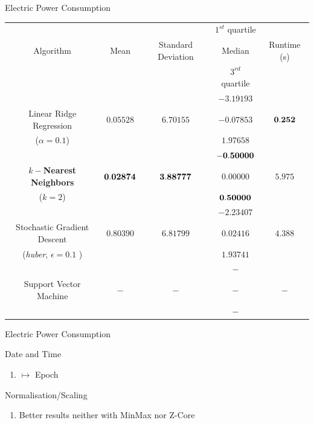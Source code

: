 \begin{frame}{Electric Power Consumption}
\begin{tcolorbox}[colback=LightSteelBlue!5,colframe=yellow!40!black,title=Final
Comparison]


\begin{table}
\centering
\resizebox{\columnwidth}{!}
	{
		\begin{tabular}{|c|c|c|c|c|}
					\hline  &&& $1^{st}$ quartile
					&\\{Algorithm}&Mean&Standard Deviation&Median& Runtime (s)\\&&& $3^{rd}$
					quartile &\\
					\hline &&&$-3.19193$&\\
					{Linear Ridge
		Regression}& $0.05528$ & $6.70155$  & $-0.07853$ & $\bf {0.252}$\\
					 ($\alpha = 0.1$)&&&$1.97658$& \\
					\hline &&&$\bf {-0.50000}$&\\
					\bf {{$k-$Nearest Neighbors}}& $\bf {0.02874}$ & $\bf {3.88777}$  &
					$0.00000$ & $5.975$\\
					 ($k = 2$)&&&$\bf {0.50000}$& \\
					\hline &&&$-2.23407$&\\
					{Stochastic Gradient Descent }& $0.80390$ & $6.81799$  & $0.02416$ &
					$4.388$\\
					({\it huber}, $\epsilon = 0.1$ )&&&$1.93741$& \\
					\hline &&&$-$&\\
					{Support Vector Machine }& $-$ & $-$  & $-$ &
					$-$\\
					&&& $-$ & \\
					\hline

		\end{tabular}
	}



\end{table}



\end{tcolorbox}
\end{frame}

\begin{frame}{Electric Power Consumption}


\begin{tcolorbox}[colback=LightSteelBlue!5,colframe=yellow!40!black,title=Preprocessing's
impact]

\bi
\mi Date and Time 
\begin{enumerate}
    \item $\mapsto$ Epoch
  \end{enumerate}
  
  \mi Normalisation/Scaling 
\begin{enumerate}
    \item Better results neither with MinMax nor Z-Core
  \end{enumerate}
  
\ei


\end{tcolorbox}

\end{frame}